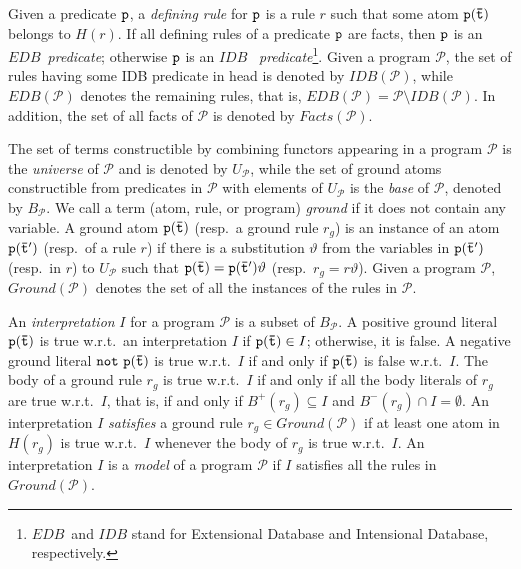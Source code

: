 \documentclass{tlp}
\newcommand{\nop}[1]{}
\newcommand{\p}{\ensuremath{{\mathcal{P}}}}
\newcommand{\GP}{\ensuremath{Ground(\p)}}
\newcommand{\BP}{\ensuremath{B_{\p}}}
\newcommand{\UP}{\ensuremath{U_{\p}}}
\newcommand{\R}{\ensuremath{r}}
\newcommand{\naf}{\ensuremath{\mathtt{not}}\xspace}
\newcommand{\ground}[1]{\ensuremath{Ground(#1)}}
\newcommand{\head}[1]{\ensuremath{H(#1)}}
\newcommand{\posbody}[1]{\ensuremath{B^+(#1)}}
\newcommand{\negbody}[1]{\ensuremath{B^-(#1)}}
\renewcommand{\P}{\mathcal{P}}
\renewcommand{\t}{\bar t}
\newcommand{\EDB}{\ensuremath{E\!D\!B}\xspace}
\newcommand{\IDB}{\ensuremath{I\!D\!B}\xspace}
\newcommand{\Facts}{\ensuremath{Facts}}
\begin{document}
Given a predicate $\tt p$, a {\em defining rule} for $\tt p$ is a rule
$\R$ such that some atom $\tt p(\t)$ belongs to $\head{\R}$. If all
defining rules of a predicate $\tt p$ are facts, then $\tt p$ is an
\EDB\ {\em predicate}; otherwise $\tt p$ is an \IDB\ {\em
predicate}\footnote{\EDB\ and \IDB stand for Extensional
Database and Intensional Database, respectively.}. 
Given a program $\p$,  
the set of rules having some IDB predicate in head
is denoted by $\IDB(\p)$, while $\EDB(\p)$ denotes the remaining rules, that is,
$\EDB(\p) = \P \setminus \IDB(\p)$.
In addition, the set of
all facts of $\p$ is denoted by $\Facts(\p)$.

The set of terms constructible by combining functors appearing in a program $\P$ is 
the \emph{universe} of $\P$ and is denoted by $\UP$,
while the set of ground atoms constructible from predicates in $\P$ with elements of $\UP$ is the \emph{base}
of $\P$, denoted by $\BP$. We call a term (atom, rule, or program) 
\emph{ground} if it does not contain any variable.
A ground atom $\tt p(\t)$ (resp.\ a ground rule $\R_g$) is
an instance of an atom $\tt p(\t')$ (resp.\ of a rule $\R$) if there is a 
substitution $\vartheta$ from the variables in $\tt p(\t')$ (resp.\ in $\R$) 
to $\UP$ such that ${\tt p(\t)} = {\tt p(\t')}\vartheta$ 
(resp.\ $\R_g = \R\vartheta$). 
Given a program $\p$, $\ground{\p}$ denotes the set of all the instances
of the rules in $\p$.

\nop{
Given an atom $\tt p(\t)$ and a set of ground atoms $A$,
by $A|_{\tt p(\t)}$ we denote the set of ground instances of $\tt p(\t)$ belonging to $A$.
For example, $\BP|_{\tt p(\t)}$ is the set of all the ground atoms obtained by applying to
$\tt p(\t)$ all the possible substitutions from the variables in $\tt p(\t)$ to $\UP$,
that is, the set of all the instances of $\tt p(\t)$. 
Abusing of notation, if $B$ is a set of atoms, by $A|_B$ we denote the union
of $A|_{\tt p(\t)}$, for each ${\tt p(\t)} \in B$.
}

An \emph{interpretation} $I$ for a program $\P$ is a subset of $\BP$. A positive ground 
literal $\tt p(\t)$ is true w.r.t.\ an
interpretation $I$ if ${\tt p(\t)}\in I$; otherwise, it is false. 
A negative ground literal $\tt \naf\ p(\t)$ is true w.r.t.\ $I$ 
if and only if $\tt p(\t)$ is false w.r.t.\ $I$. 
The body of a ground rule $\R_g$ is true w.r.t.\ $I$
if and only if all the body literals of $\R_g$ are true w.r.t.\ $I$, that is,
if and only if $\posbody{\R_g} \subseteq I$ and $\negbody{\R_g} \cap I = \emptyset$. 
An interpretation $I$ {\em satisfies} a ground rule $\R_g\in \GP$ if at least one atom
in $\head{\R_g}$ is true w.r.t.\ $I$ whenever the body of $\R_g$ is true w.r.t.\ $I$. An interpretation $I$ is a
\emph{model} of a program $\P$ if $I$ satisfies all the rules in $\GP$. 
\nop{
Since an interpretation is a set of atoms, if $I$ is an interpretation
for a program $\p$, and $\p'$ is another program,
then by $I|_{B_{\p'}}$ we denote the restriction of $I$ to the predicate
symbols in $\p'$.
}
\end{document}
